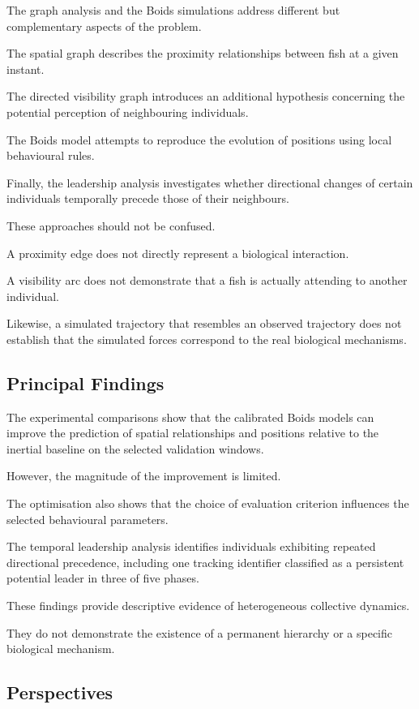 \documentclass[10pt,a4paper]{article}
\begin{document}
The graph analysis
and the Boids simulations
address different
but complementary
aspects of the problem.

The spatial graph
describes the proximity
relationships between
fish at a given instant.

The directed visibility
graph introduces
an additional hypothesis
concerning the potential
perception of neighbouring
individuals.

The Boids model attempts
to reproduce the evolution
of positions using
local behavioural rules.

Finally, the leadership
analysis investigates
whether directional changes
of certain individuals
temporally precede those
of their neighbours.

These approaches
should not be confused.

A proximity edge
does not directly
represent a biological
interaction.

A visibility arc
does not demonstrate
that a fish is
actually attending
to another individual.

Likewise, a simulated
trajectory that resembles
an observed trajectory
does not establish
that the simulated
forces correspond
to the real biological
mechanisms.

\subsection{Principal Findings}

The experimental
comparisons show
that the calibrated
Boids models can
improve the prediction
of spatial relationships
and positions relative
to the inertial baseline
on the selected
validation windows.

However, the magnitude
of the improvement
is limited.

The optimisation also
shows that the choice
of evaluation criterion
influences the selected
behavioural parameters.

The temporal leadership
analysis identifies
individuals exhibiting
repeated directional
precedence, including
one tracking identifier
classified as a
persistent potential
leader in three
of five phases.

These findings provide
descriptive evidence
of heterogeneous
collective dynamics.

They do not demonstrate
the existence of
a permanent hierarchy
or a specific
biological mechanism.

\subsection{Perspectives}
\end{document}
